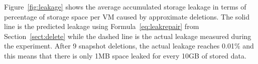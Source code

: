 

Figure~\ref{fig:leakage} shows the average accumulated storage leakage in terms of percentage of
storage space per VM caused  by approximate deletions.
The solid line is the predicted leakage using Formula~\ref{eq:leakrepair} from Section~\ref{sect:delete}
while the dashed line is the actual leakage measured during the experiment.
After 9 snapshot deletions, the actual leakage reaches 0.01\% and this means that
there is only 1MB space leaked for every 10GB of stored data. 
